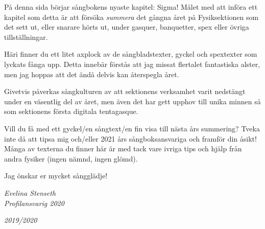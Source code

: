 \documentclass[a6paper,10pt]{article}
\begin{document}
\noindent
{}
\vspace{10pt}

\noindent
\small
På denna sida börjar sångbokens nyaste kapitel: Sigma! Målet med att införa ett kapitel som detta är att försöka \textit{summera} det gångna året på Fysiksektionen som det sett ut, eller snarare hörts ut, under gasquer, banquetter, spex eller övriga tillställningar. 

Häri finner du ett litet axplock av de sångbladstexter, gyckel och spextexter som lyckats fånga upp. Detta innebär förstås att jag missat flertalet fantastiska alster, men jag hoppas att det ändå delvis  kan återspegla året.

Givetvis påverkas sångkulturen av att sektionens verksamhet varit nedstängt under en väsentlig del av året, men även det har gett upphov till unika minnen så som sektionens första digitala tentagasque.

Vill du få med ett gyckel/en sångtext/en fin visa till nästa års summering? Tveka inte då att tipsa mig och/eller 2021 års sångboksansvariga och framför din åsikt! Många av texterna du finner här är med tack vare ivriga tips och hjälp från andra fysiker (ingen nämnd, ingen glömd). 

Jag önskar er mycket sångglädje! 
\begin{flushright}
\textit{Evelina Stenseth \\Profilansvarig 2020}
\end{flushright}
\setlength{\oddsidemargin}{-0.47in}

\begin{center}
\huge \textit{2019/2020}
\end{center}
\end{document}
